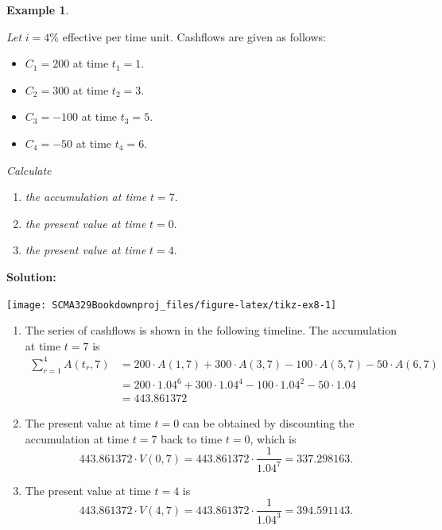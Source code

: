 \documentclass[
]{book}
\theoremstyle{definition}
\theoremstyle{definition}
\newtheorem{example}{Example}[chapter]
\theoremstyle{definition}
\theoremstyle{definition}
\theoremstyle{remark}
\begin{document}
\begin{example}
\protect\hypertarget{exm:unlabeled-div-24}{}\label{exm:unlabeled-div-24}

\emph{Let} \(i = 4\%\) effective per time unit. Cashflows are given as follows:

\begin{itemize}
\item
  \(C_1 = 200\) at time \(t_1 = 1\).
\item
  \(C_2 = 300\) at time \(t_2 = 3\).
\item
  \(C_3 = -100\) at time \(t_3 = 5\).
\item
  \(C_4 = -50\) at time \(t_4 = 6\).
\end{itemize}

\emph{Calculate}

\begin{enumerate}
\def\labelenumi{\arabic{enumi}.}
\item
  \emph{the accumulation at time} \(t = 7\).
\item
  \emph{the present value at time} \(t = 0\).
\item
  \emph{the present value at time} \(t = 4\).
\end{enumerate}

\end{example}

\textbf{Solution:}

\begin{center}\texttt{[image: SCMA329Bookdownproj\_files/figure-latex/tikz-ex8-1]} \end{center}

\begin{enumerate}
\def\labelenumi{\arabic{enumi}.}
\item
  The series of cashflows is shown in the following timeline. The
  accumulation at time \(t = 7\) is \[\begin{aligned}
      \sum_{r=1}^4 A(t_r,7) &= 200 \cdot A(1,7) +  300 \cdot A(3,7) -  100 \cdot A(5,7) -  50 \cdot A(6,7) \\
      &= 200 \cdot 1.04^6 + 300 \cdot 1.04^4 - 100 \cdot 1.04^2 - 50 \cdot 1.04 \\
      & = 443.861372\end{aligned}\]
\item
  The present value at time \(t = 0\) can be obtained by discounting the
  accumulation at time \(t = 7\) back to time \(t = 0\), which is
  \[443.861372  \cdot V(0,7) = 443.861372  \cdot \frac{1}{1.04^7} = 337.298163.\]
\item
  The present value at time \(t = 4\) is
  \[443.861372  \cdot V(4,7) = 443.861372  \cdot \frac{1}{1.04^3} = 394.591143.\]
\end{enumerate}
\end{document}
